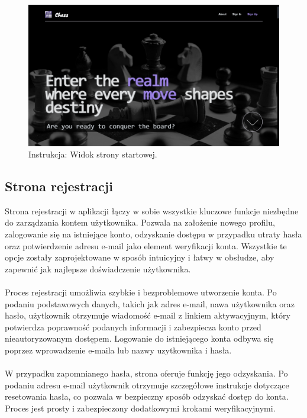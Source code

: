 \documentclass[12pt,a4paper]{article}
\begin{document}
\vspace{0.5cm}
\begin{figure}[h!]
    \centering
    \includegraphics[width=1\textwidth]{images/ins_hero.png}
    \caption{Instrukcja: Widok strony startowej.}
\end{figure}

\newpage
\subsection{Strona rejestracji}
Strona rejestracji w aplikacji łączy w sobie wszystkie kluczowe funkcje niezbędne do zarządzania kontem użytkownika. Pozwala na założenie nowego profilu, zalogowanie się na istniejące konto, odzyskanie dostępu w przypadku utraty hasła oraz potwierdzenie adresu e-mail jako element weryfikacji konta. Wszystkie te opcje zostały zaprojektowane w sposób intuicyjny i łatwy w obsłudze, aby zapewnić jak najlepsze doświadczenie użytkownika.
\\\\
Proces rejestracji umożliwia szybkie i bezproblemowe utworzenie konta. Po podaniu podstawowych danych, takich jak adres e-mail, nawa użytkownika oraz hasło, użytkownik otrzymuje wiadomość e-mail z linkiem aktywacyjnym, który potwierdza poprawność podanych informacji i zabezpiecza konto przed nieautoryzowanym dostępem. Logowanie do istniejącego konta odbywa się poprzez wprowadzenie e-maila lub nazwy uzytkownika i hasła.
\\\\
W przypadku zapomnianego hasła, strona oferuje funkcję jego odzyskania. Po podaniu adresu e-mail użytkownik otrzymuje szczegółowe instrukcje dotyczące resetowania hasła, co pozwala w bezpieczny sposób odzyskać dostęp do konta. Proces jest prosty i zabezpieczony dodatkowymi krokami weryfikacyjnymi.
\end{document}
